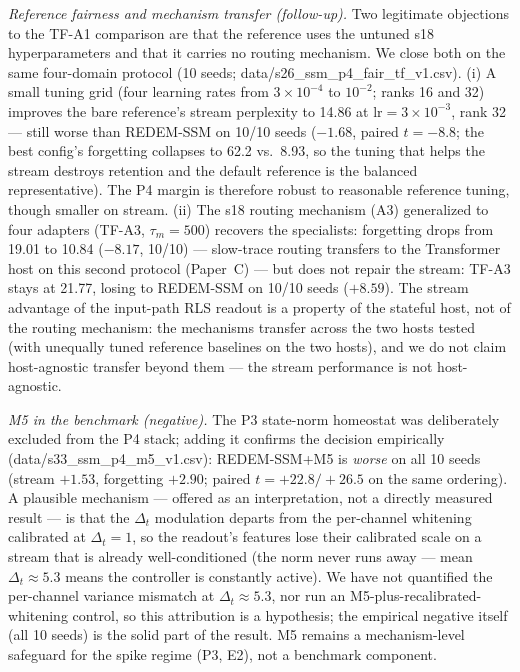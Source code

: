 \documentclass[preprint,12pt]{elsarticle}
\begin{document}
{\sloppy
\emph{Reference fairness and mechanism transfer (follow-up).} Two
legitimate objections to the TF-A1 comparison are that the reference
uses the untuned s18 hyperparameters and that it carries no routing
mechanism. We close both on the same four-domain protocol (10 seeds;
data/s26\_ssm\_p4\_fair\_tf\_v1.csv). (i) A small tuning grid (four
learning rates from $3\times10^{-4}$ to $10^{-2}$; ranks 16 and 32)
improves the bare reference's stream perplexity to 14.86 at
$\mathrm{lr}{=}3\times10^{-3}$, rank 32 --- still worse than REDEM-SSM
on 10/10 seeds ($-1.68$, paired $t=-8.8$; the best config's forgetting
collapses to 62.2
vs.\ 8.93, so the tuning that helps the stream destroys retention and
the default reference is the balanced representative). The P4 margin is
therefore robust to reasonable reference tuning, though smaller on
stream. (ii) The s18 routing mechanism (A3) generalized to four adapters
(TF-A3, $\tau_m{=}500$) recovers the specialists: forgetting drops from
19.01 to 10.84 ($-8.17$, 10/10) --- slow-trace routing transfers to the
Transformer host on this second protocol (Paper~C) --- but does not
repair the stream: TF-A3 stays at 21.77, losing to REDEM-SSM on 10/10
seeds ($+8.59$). The stream advantage of the input-path RLS readout is a
property of the stateful host, not of the routing mechanism: the
mechanisms transfer across the two hosts tested (with unequally tuned
reference baselines on the two hosts), and we do not claim
host-agnostic transfer beyond them --- the stream performance is not
host-agnostic.\par}

\emph{M5 in the benchmark (negative).} The P3 state-norm homeostat was
deliberately excluded from the P4 stack; adding it confirms the decision
empirically (data/s33\_ssm\_p4\_m5\_v1.csv): REDEM-SSM+M5 is \emph{worse}
on all 10 seeds (stream $+1.53$, forgetting $+2.90$; paired $t =
+22.8/+26.5$ on the same ordering). A plausible mechanism --- offered as an interpretation,
not a directly measured result --- is that the $\Delta_t$ modulation
departs from the per-channel whitening calibrated at $\Delta_t = 1$, so
the readout's features lose their calibrated scale on a stream that is
already well-conditioned (the norm never runs away --- mean $\Delta_t
\approx 5.3$ means the controller is constantly active). We have not
quantified the per-channel variance mismatch at $\Delta_t \approx
5.3$, nor run an M5-plus-recalibrated-whitening control, so this
attribution is a hypothesis; the empirical negative itself (all 10
seeds) is the solid part of the result. M5 remains a
mechanism-level safeguard for the spike regime (P3, E2), not a benchmark
component.
\end{document}
